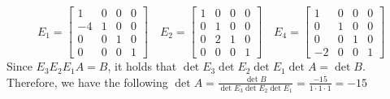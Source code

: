 \begin{SaveQuestion}
    $$E_1 = \begin{bmatrix} 1 & 0 & 0 & 0 \\ -4 & 1 & 0 & 0 \\ 0 & 0 & 1 & 0 \\ 0 & 0 & 0 & 1 \end{bmatrix} \quad E_2 = \begin{bmatrix} 1 & 0 & 0 & 0 \\ 0 & 1 & 0 & 0 \\ 0 & 2 & 1 & 0 \\ 0 & 0 & 0 & 1 \end{bmatrix} \quad E_4 = \begin{bmatrix} 1 & 0 & 0 & 0 \\ 0 & 1 & 0 & 0 \\ 0 & 0 & 1 & 0 \\ -2 & 0 & 0 & 1 \end{bmatrix}$$
    Since $E_3 E_2 E_1 A = B$, it holds that $\det E_3 \det E_2 \det E_1 \det A = \det B$. Therefore, we have the following $\det A = \frac{\det B}{\det E_3 \det E_2 \det E_1} = \frac{-15}{1 \cdot 1 \cdot 1} = -15$
\end{SaveQuestion}



